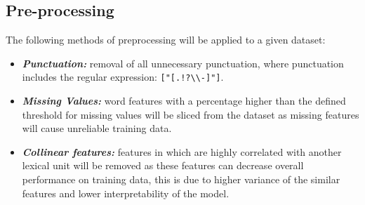 \subsection{Pre-processing} \label{sub:C5Preprocessing}

The following methods of preprocessing will be applied to a given dataset:

\begin{itemize}
    \item \textbf{\textit{Punctuation:}} removal of all unnecessary punctuation, where punctuation includes the regular expression: \verb|["[.!?\\-]"]|.
    \item \textbf{\textit{Missing Values:}} word features with a percentage higher than the defined threshold for missing values will be sliced from the dataset as missing features will cause unreliable training data.
    \item \textbf{\textit{Collinear features:}} features in which are highly correlated with another lexical unit will be removed as these features can decrease overall performance on training data, this is due to higher variance of the similar features and lower interpretability of the model.
\end{itemize}
